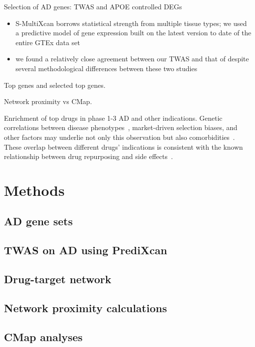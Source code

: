 \documentclass[letterpaper]{article}
\begin{document}
Selection of AD genes: TWAS and APOE controlled DEGs
\begin{itemize}
\item S-MultiXcan borrows statistical strength from multiple tissue types; we used
a predictive model of gene expression built on the latest version to date of
the entire GTEx data set
\item we found a relatively close agreement between our TWAS and that of
\cite{Jansen2019} despite
several methodological differences between these two studies 
\end{itemize}

Top genes and selected top genes.

Network proximity vs CMap.

Enrichment of top drugs in phase 1-3 AD and other indications.  Genetic
correlations between disease phenotypes~\citep{Consortium2018}, market-driven
selection biases, and other factors may underlie not only this observation but
also comorbidities~\citep{Santiago2021}.  These overlap between different
drugs' indications is consistent with the known relationship between drug
repurposing and side effects~\citep{Ye2014}.

\section{Methods}

\subsection{AD gene sets}

\subsection{TWAS on AD using PrediXcan}

\subsection{Drug-target network}

\subsection{Network proximity calculations}

\subsection{CMap analyses}
\end{document}
